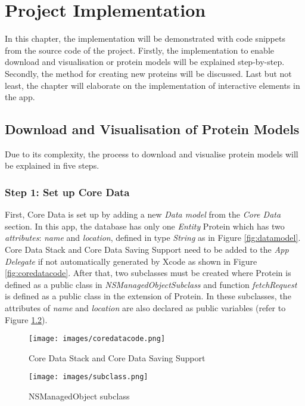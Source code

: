 \chapter{Project Implementation}
\label{ch:implementation}

In this chapter, the implementation will be demonstrated with code snippets from the source code of the project. Firstly, the implementation to enable download and visualisation or protein models will be explained step-by-step. Secondly, the method for creating new proteins will be discussed. Last but not least, the chapter will elaborate on the implementation of interactive elements in the app.

\section{Download and Visualisation of Protein Models}
Due to its complexity, the process to download and visualise protein models will be explained in five steps.
\subsection{Step 1: Set up Core Data}
First, Core Data is set up by adding a new \emph{Data model} from the \emph{Core Data} section. In this app, the database has only one \emph{Entity} Protein which has two \emph{attributes}: \emph{name} and \emph{location}, defined in type \emph{String} as in Figure \ref{fig:datamodel}. Core Data Stack and Core Data Saving Support need to be added to the \emph{App Delegate} if not automatically generated by Xcode as shown in Figure \ref{fig:coredatacode}. After that, two subclasses must be created where Protein is defined as a public class in \emph{NSManagedObjectSubclass} and function \emph{fetchRequest} is defined as a public class in the extension of Protein. In these subclasses, the attributes of \emph{name} and \emph{location} are also declared as public variables (refer to Figure \ref{fig:subclass}).
 \begin{figure}[!htp]
	\centering
	\texttt{[image: images/coredatacode.png]}
	\caption{Core Data Stack and Core Data Saving Support}
	\label{fig:coderatacode}
\end{figure}

 \begin{figure}[!htp]
	\centering
	\texttt{[image: images/subclass.png]}
	\caption{NSManagedObject subclass}
	\label{fig:subclass}
\end{figure}

